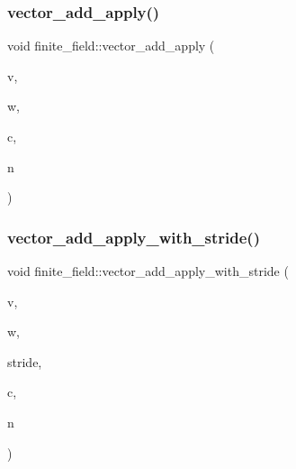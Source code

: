 \mbox{\label{classfinite__field_a1be979358efe74a27474887e996b9fed}} 
\subsubsection{\texorpdfstring{vector\+\_\+add\+\_\+apply()}{vector\_add\_apply()}}
{\footnotesize\ttfamily void finite\+\_\+field\+::vector\+\_\+add\+\_\+apply (\begin{DoxyParamCaption}\item[{\mbox{\hyperlink{galois_8h_a09fddde158a3a20bd2dcadb609de11dc}{I\+NT}} $\ast$}]{v,  }\item[{\mbox{\hyperlink{galois_8h_a09fddde158a3a20bd2dcadb609de11dc}{I\+NT}} $\ast$}]{w,  }\item[{\mbox{\hyperlink{galois_8h_a09fddde158a3a20bd2dcadb609de11dc}{I\+NT}}}]{c,  }\item[{\mbox{\hyperlink{galois_8h_a09fddde158a3a20bd2dcadb609de11dc}{I\+NT}}}]{n }\end{DoxyParamCaption})}

\mbox{\label{classfinite__field_a083c48b77436e2e0d5277ee6d434f5ae}} 
\subsubsection{\texorpdfstring{vector\+\_\+add\+\_\+apply\+\_\+with\+\_\+stride()}{vector\_add\_apply\_with\_stride()}}
{\footnotesize\ttfamily void finite\+\_\+field\+::vector\+\_\+add\+\_\+apply\+\_\+with\+\_\+stride (\begin{DoxyParamCaption}\item[{\mbox{\hyperlink{galois_8h_a09fddde158a3a20bd2dcadb609de11dc}{I\+NT}} $\ast$}]{v,  }\item[{\mbox{\hyperlink{galois_8h_a09fddde158a3a20bd2dcadb609de11dc}{I\+NT}} $\ast$}]{w,  }\item[{\mbox{\hyperlink{galois_8h_a09fddde158a3a20bd2dcadb609de11dc}{I\+NT}}}]{stride,  }\item[{\mbox{\hyperlink{galois_8h_a09fddde158a3a20bd2dcadb609de11dc}{I\+NT}}}]{c,  }\item[{\mbox{\hyperlink{galois_8h_a09fddde158a3a20bd2dcadb609de11dc}{I\+NT}}}]{n }\end{DoxyParamCaption})}

